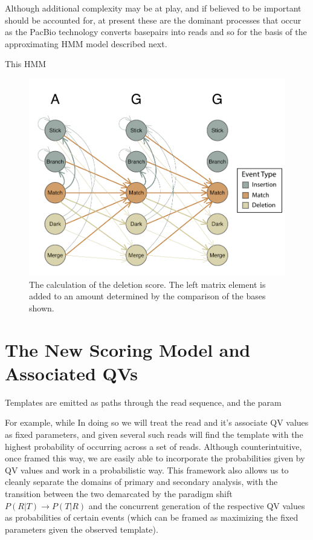 \documentclass[fleqn,10pt]{SelfArx} %
\begin{document}
Although additional complexity may be at play, and if believed to be important should be accounted for, at present these are the dominant processes that occur as the PacBio technology converts basepairs into reads and so for the basis of the approximating HMM model described next.

This HMM 

\begin{figure}[ht] %
	\includegraphics[width=\linewidth]{Hmm}
		\caption{The calculation of the deletion score.  The left matrix element is added to an amount determined by the comparison of the bases shown.}				
\end{figure}

 



\section{The New Scoring Model and Associated QVs}

  Templates are emitted as paths through the read sequence, and the param

  For example, while 
In doing so we will treat the read and it's associate QV values as fixed parameters, and given several such reads will find the template with the highest probability of occurring across a set of reads.  Although counterintuitive, once framed this way, we are easily able to incorporate the probabilities given by QV values and work in a probabilistic way.  This framework also allows us to cleanly separate the domains of primary and secondary analysis, with the transition between the two demarcated by the paradigm shift  $P(R|T) \rightarrow P(T|R) $ and the concurrent generation of the respective QV values as probabilities of certain events (which can be framed as maximizing the fixed parameters given the observed template). 
\end{document}

